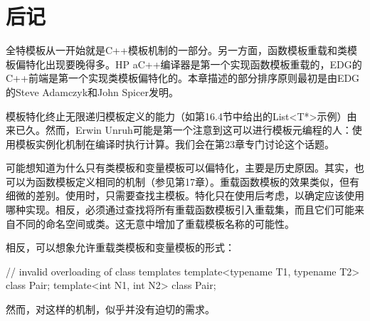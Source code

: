 \section{后记}
全特模板从一开始就是C++模板机制的一部分。另一方面，函数模板重载和类模板偏特化出现要晚得多。HP aC++编译器是第一个实现函数模板重载的，EDG的C++前端是第一个实现类模板偏特化的。本章描述的部分排序原则最初是由EDG的Steve Adamczyk和John Spicer发明。

模板特化终止无限递归模板定义的能力（如第16.4节中给出的List<T*>示例）由来已久。然而，Erwin Unruh可能是第一个注意到这可以进行模板元编程的人：使用模板实例化机制在编译时执行计算。我们会在第23章专门讨论这个话题。

可能想知道为什么只有类模板和变量模板可以偏特化，主要是历史原因。其实，也可以为函数模板定义相同的机制（参见第17章）。重载函数模板的效果类似，但有细微的差别。使用时，只需要查找主模板。特化只在使用后考虑，以确定应该使用哪种实现。相反，必须通过查找将所有重载函数模板引入重载集，而且它们可能来自不同的命名空间或类。这无意中增加了重载模板名称的可能性。

相反，可以想象允许重载类模板和变量模板的形式：

\begin{cpp}
// invalid overloading of class templates
template<typename T1, typename T2> class Pair;
template<int N1, int N2> class Pair;
\end{cpp}

然而，对这样的机制，似乎并没有迫切的需求。